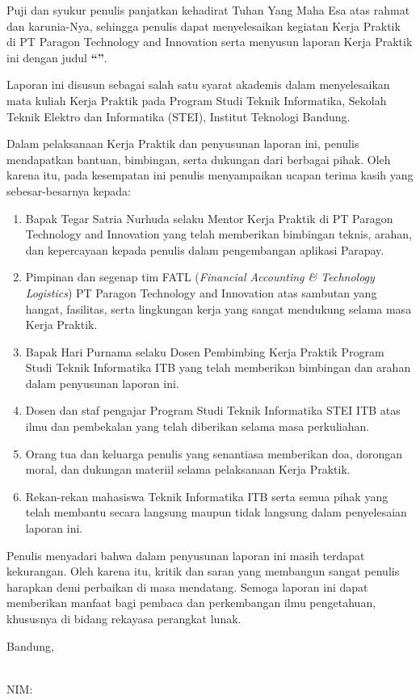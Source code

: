 \clearpage
{}

Puji dan syukur penulis panjatkan kehadirat Tuhan Yang Maha Esa atas rahmat dan karunia-Nya, sehingga penulis dapat menyelesaikan kegiatan Kerja Praktik di PT Paragon Technology and Innovation serta menyusun laporan Kerja Praktik ini dengan judul \textbf{“\JudulLaporan”}.

Laporan ini disusun sebagai salah satu syarat akademis dalam menyelesaikan mata kuliah Kerja Praktik pada Program Studi Teknik Informatika, Sekolah Teknik Elektro dan Informatika (STEI), Institut Teknologi Bandung.

Dalam pelaksanaan Kerja Praktik dan penyusunan laporan ini, penulis mendapatkan bantuan, bimbingan, serta dukungan dari berbagai pihak. Oleh karena itu, pada kesempatan ini penulis menyampaikan ucapan terima kasih yang sebesar-besarnya kepada:

\begin{enumerate}[label=\arabic*.]
  \item Bapak Tegar Satria Nurhuda selaku Mentor Kerja Praktik di PT Paragon Technology and Innovation yang telah memberikan bimbingan teknis, arahan, dan kepercayaan kepada penulis dalam pengembangan aplikasi Parapay.
  \item Pimpinan dan segenap tim FATL (\textit{Financial Accounting \& Technology Logistics}) PT Paragon Technology and Innovation atas sambutan yang hangat, fasilitas, serta lingkungan kerja yang sangat mendukung selama masa Kerja Praktik.
  \item Bapak Hari Purnama selaku Dosen Pembimbing Kerja Praktik Program Studi Teknik Informatika ITB yang telah memberikan bimbingan dan arahan dalam penyusunan laporan ini.
  \item Dosen dan staf pengajar Program Studi Teknik Informatika STEI ITB atas ilmu dan pembekalan yang telah diberikan selama masa perkuliahan.
  \item Orang tua dan keluarga penulis yang senantiasa memberikan doa, dorongan moral, dan dukungan materiil selama pelaksanaan Kerja Praktik.
  \item Rekan-rekan mahasiswa Teknik Informatika ITB serta semua pihak yang telah membantu secara langsung maupun tidak langsung dalam penyelesaian laporan ini.
\end{enumerate}

Penulis menyadari bahwa dalam penyusunan laporan ini masih terdapat kekurangan. Oleh karena itu, kritik dan saran yang membangun sangat penulis harapkan demi perbaikan di masa mendatang. Semoga laporan ini dapat memberikan manfaat bagi pembaca dan perkembangan ilmu pengetahuan, khususnya di bidang rekayasa perangkat lunak.

\vspace{1.0cm}
\begin{flushright}
Bandung, \TanggalPengesahan

\vspace{1.5cm}
\textbf{\NamaMahasiswa}\\
NIM: \NIM
\end{flushright}
